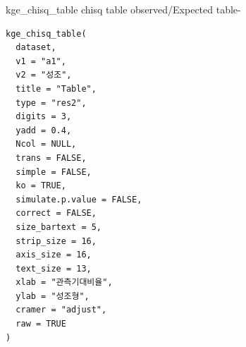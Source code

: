 \documentclass[a4paper]{book}
\begin{document}
%
\begin{Description}
kge\_chisq\_table chisq table observed/Expected table-
\end{Description}
%
\begin{Usage}
\begin{verbatim}
kge_chisq_table(
  dataset,
  v1 = "a1",
  v2 = "성조",
  title = "Table",
  type = "res2",
  digits = 3,
  yadd = 0.4,
  Ncol = NULL,
  trans = FALSE,
  simple = FALSE,
  ko = TRUE,
  simulate.p.value = FALSE,
  correct = FALSE,
  size_bartext = 5,
  strip_size = 16,
  axis_size = 16,
  text_size = 13,
  xlab = "관측기대비율",
  ylab = "성조형",
  cramer = "adjust",
  raw = TRUE
)
\end{verbatim}
\end{Usage}
%
\end{document}
